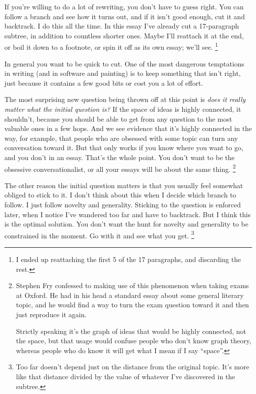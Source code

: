 \documentclass[12pt]{book}
\begin{document}
If you're willing to do a lot of rewriting, you don't have to guess
right. You can follow a branch and see how it turns out, and if it isn't
good enough, cut it and backtrack. I do this all the time. In this essay
I've already cut a 17-paragraph subtree, in addition to countless
shorter ones. Maybe I'll reattach it at the end, or boil it down to a
footnote, or spin it off as its own essay; we'll see.
\footnote{I ended up reattaching the first 5 of the 17 paragraphs, and
discarding the rest.}

In general you want to be quick to cut. One of the most dangerous
temptations in writing (and in software and painting) is to keep
something that isn't right, just because it contains a few good bits or
cost you a lot of effort.

The most surprising new question being thrown off at this point is
\emph{does it really matter what the initial question is?} If the space
of ideas is highly connected, it shouldn't, because you should be able
to get from any question to the most valuable ones in a few hops. And we
see evidence that it's highly connected in the way, for example, that
people who are obsessed with some topic can turn any conversation toward
it. But that only works if you know where you want to go, and you don't
in an essay. That's the whole point. You don't want to be the obsessive
conversationalist, or all your essays will be about the same thing.
\footnote{Stephen Fry confessed to making use of this phenomenon when
taking exams at Oxford. He had in his head a standard essay about some
general literary topic, and he would find a way to turn the exam
question toward it and then just reproduce it again.

Strictly speaking it's the graph of ideas that would be highly
connected, not the space, but that usage would confuse people who don't
know graph theory, whereas people who do know it will get what I mean if
I say ``space''.}

The other reason the initial question matters is that you usually feel
somewhat obliged to stick to it. I don't think about this when I decide
which branch to follow. I just follow novelty and generality. Sticking
to the question is enforced later, when I notice I've wandered too far
and have to backtrack. But I think this is the optimal solution. You
don't want the hunt for novelty and generality to be constrained in the
moment. Go with it and see what you get. \footnote{Too far doesn't depend just on the distance from the original
topic. It's more like that distance divided by the value of whatever
I've discovered in the subtree.}
\end{document}
